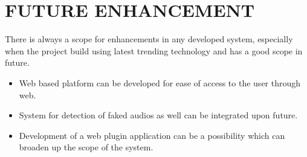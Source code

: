 
\section{FUTURE ENHANCEMENT}
There is always a scope for enhancements in any developed system, especially
when the project build using latest trending technology and has a good scope in
future.
\begin{itemize}
    \item Web based platform can be developed for ease of access to
          the user through web.
    \item System for detection of faked audios as well can be integrated upon future.
    \item Development of a web plugin application can be a possibility which can broaden up the scope of the system.
\end{itemize}
